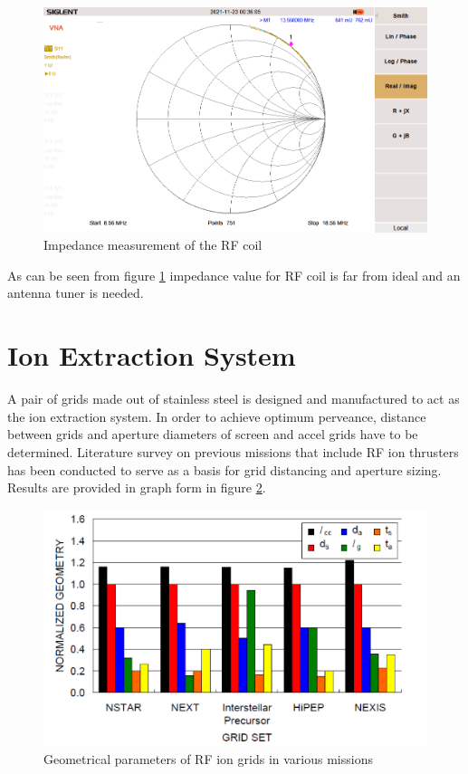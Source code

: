 \begin{figure}[ht]
    \centering
    \includegraphics[scale=0.75]{fig/smithchart_meas.png}
    \caption{Impedance measurement of the RF coil}
    \label{fig:smithchart_meas}
\end{figure}
 
As can be seen from figure \ref{fig:smithchart_meas} impedance value for RF coil is far from ideal and an antenna tuner is needed.

\newpage
\section{Ion Extraction System} 
A pair of grids made out of stainless steel is designed and manufactured to act as the ion extraction system. In order to achieve optimum perveance, distance between grids and aperture diameters of screen and accel grids have to be determined. Literature survey on previous missions that include RF ion thrusters has been conducted to serve as a basis for grid distancing and aperture sizing. Results are provided in graph form in figure \ref{fig:farnellgrids}. 

\begin{figure}[ht]
    \centering
\includegraphics{fig/farnellgrids.png}
\caption[Geometrical parameters of RF ion grids in various missions]{Geometrical parameters of RF ion grids in various missions\cite{farnell2007performance}}
\label{fig:farnellgrids}
\end{figure}

